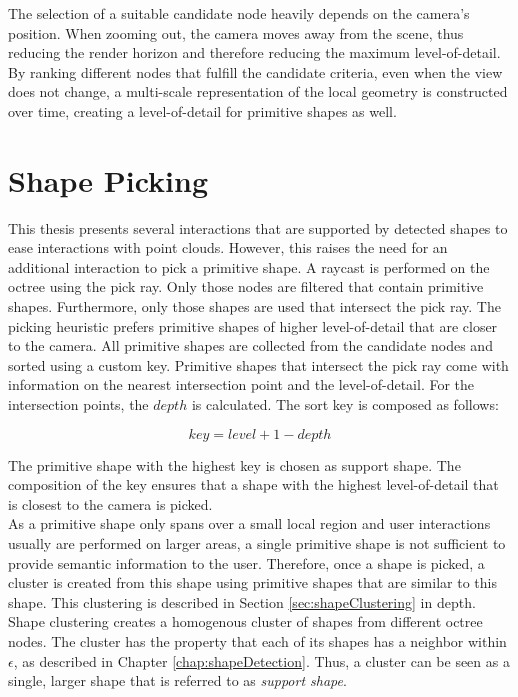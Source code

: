 The selection of a suitable candidate node heavily depends on the camera's position. When zooming out, the camera moves away from the scene, thus reducing the render horizon and therefore reducing the maximum level-of-detail. By ranking different nodes that fulfill the candidate criteria, even when the view does not change, a multi-scale representation of the local geometry is constructed over time, creating a level-of-detail for primitive shapes as well. 


\section{Shape Picking}
\label{sec:shapePicking}

This thesis presents several interactions that are supported by detected shapes to ease interactions with point clouds.  
However, this raises the need for an additional interaction to pick a primitive shape. A raycast is performed on the octree using the pick ray. Only those nodes are filtered that contain primitive shapes. Furthermore, only those shapes are used that intersect the pick ray. The picking heuristic prefers primitive shapes of higher level-of-detail that are closer to the camera. All primitive shapes are collected from the candidate nodes and sorted using a custom key. Primitive shapes that intersect the pick ray come with information on the nearest intersection point and the level-of-detail. For the intersection points, the $depth$ is calculated. The sort key is composed as follows: 

$$key = level + 1 - depth$$

The primitive shape with the highest key is chosen as support shape. The composition of the key ensures that a shape with the highest level-of-detail that is closest to the camera is picked.
\\
As a primitive shape only spans over a small local region and user interactions usually are performed on larger areas, a single primitive shape is not sufficient to provide semantic information to the user. Therefore, once a shape is picked, a cluster is created from this shape using primitive shapes that are similar to this shape. This clustering is described in Section \ref{sec:shapeClustering} in depth. Shape clustering creates a homogenous cluster of shapes from different octree nodes. The cluster has the property that each of its shapes has a neighbor within $\epsilon$,
 as described in Chapter \ref{chap:shapeDetection}. Thus, a cluster can be seen as a single, larger shape that is referred to as \textit{support shape}.



